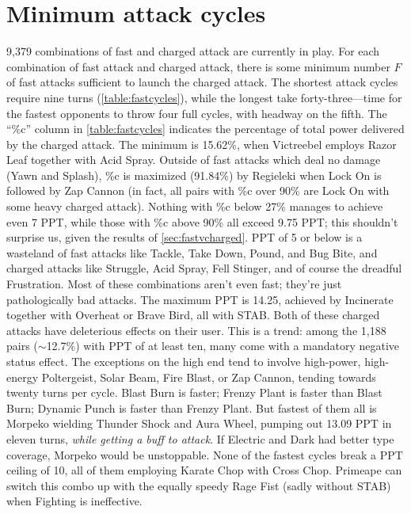\section{Minimum attack cycles}
9,379 combinations of fast and charged attack are currently in play.
For each combination of fast attack and charged attack, there is some minimum number
 $F$ of fast attacks sufficient to launch the charged attack.
The shortest attack cycles require nine turns (\autoref{table:fastcycles}),
 while the longest take forty-three---time for the fastest opponents to
 throw four full cycles, with headway on the fifth.
The ``\%c'' column in \autoref{table:fastcycles} indicates the percentage of total
 power delivered by the charged attack.
The minimum is 15.62\%, when Victreebel employs Razor Leaf together with Acid Spray.
Outside of fast attacks which deal no damage (Yawn and Splash), \%c is maximized (91.84\%)
 by Regieleki when Lock On is followed by Zap Cannon
 (in fact, all pairs with \%c over 90\% are Lock On with some heavy charged attack).
Nothing with \%c below 27\% manages to achieve even 7 PPT, while
 those with \%c above 90\% all exceed 9.75 PPT; this shouldn't surprise
 us, given the results of \autoref{sec:fastvcharged}.
PPT of 5 or below is a wasteland of fast attacks like Tackle, Take Down, Pound, and Bug Bite,
 and charged attacks like Struggle, Acid Spray, Fell Stinger, and of course the dreadful Frustration.
Most of these combinations aren't even fast; they're just pathologically bad attacks.
The maximum PPT is 14.25, achieved by Incinerate together with Overheat or Brave Bird, all with STAB.
Both of these charged attacks have deleterious effects on their user.
This is a trend: among the 1,188 pairs ($\sim$12.7\%) with PPT of at least ten,
 many come with a mandatory negative status effect.
The exceptions on the high end tend to involve high-power, high-energy Poltergeist, Solar Beam, Fire Blast, or Zap Cannon,
 tending towards twenty turns per cycle.
Blast Burn is faster; Frenzy Plant is faster than Blast Burn; Dynamic Punch is faster than Frenzy Plant.
But fastest of them all is Morpeko wielding Thunder Shock and Aura Wheel, pumping out 13.09 PPT
 in eleven turns, \textit{while getting a buff to attack}.
If Electric and Dark had better type coverage, Morpeko would be unstoppable.
None of the fastest cycles break a PPT ceiling of 10, all of them employing Karate Chop with Cross Chop.
Primeape can switch this combo up with the equally speedy Rage Fist (sadly without STAB)
 when Fighting is ineffective.


